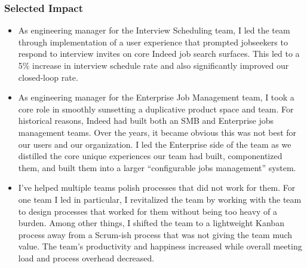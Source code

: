 \documentclass[11pt]{amsart}
\begin{document}
\begin{tcolorbox}[
	title=Software Engineering Manager \textcolor{DarkGray}{/} Indeed,
	after title={\hfill2019 \textcolor{DarkGray}{$\rightarrow$} Present \textcolor{DarkGray}{(6 years)}}
]
\subsubsection{Selected Impact}

\begin{itemize}[noitemsep, leftmargin=2em, label=\raisebox{0.25ex}{\tiny$\bullet$}]
	\item As engineering manager for the Interview Scheduling team, I led the team through implementation of a user experience that prompted jobseekers to respond to interview invites on core Indeed job search surfaces. This led to a 5\% increase in interview schedule rate and also significantly improved our closed-loop rate.
	\item As engineering manager for the Enterprise Job Management team, I took a core role in smoothly sunsetting a duplicative product space and team. For historical reasons, Indeed had built both an SMB and Enterprise jobs management teams. Over the years, it became obvious this was not best for our users and our organization. I led the Enterprise side of the team as we distilled the core unique experiences our team had built, componentized them, and built them into a larger ``configurable jobs management'' system.
	\item I've helped multiple teams polish processes that did not work for them. For one team I led in particular, I revitalized the team by working with the team to design processes that worked for them without being too heavy of a burden. Among other things, I shifted the team to a lightweight Kanban process away from a Scrum-ish process that was not giving the team much value. The team's productivity and happiness increased while overall meeting load and process overhead decreased. %
\end{itemize}

\end{tcolorbox}
\end{document}
